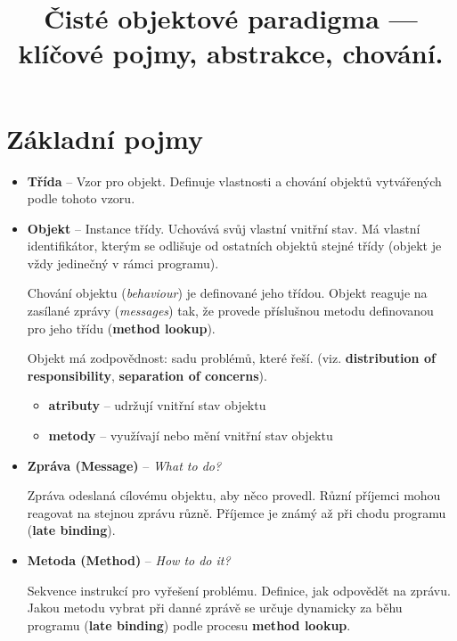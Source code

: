 \documentclass{szzclass}
\title{Čisté objektové paradigma — klíčové pojmy, abstrakce, chování.}
\begin{document}
\maketitle

\tableofcontents
\newpage

\section{Základní pojmy}

\begin{itemize}
      \item \textbf{Třída} -- Vzor pro objekt. Definuje vlastnosti a chování objektů vytvářených podle tohoto vzoru.
      \item \textbf{Objekt} -- Instance třídy. Uchovává svůj vlastní vnitřní stav. Má vlastní identifikátor,
      kterým se odlišuje od ostatních objektů stejné třídy (objekt je vždy jedinečný v rámci programu).
      
      Chování objektu (\textit{behaviour}) je definované jeho třídou. Objekt reaguje na zasílané zprávy 
      (\textit{messages}) tak, že provede příslušnou metodu definovanou pro jeho třídu (\textbf{method lookup}).

      Objekt má zodpovědnost: sadu problémů, které řeší. (viz. \textbf{distribution of responsibility}, \textbf{separation of concerns}).

      \begin{itemize}
            \item \textbf{atributy} -- udržují vnitřní stav objektu
            \item \textbf{metody} -- využívají nebo mění vnitřní stav objektu
      \end{itemize}

      \item \textbf{Zpráva (Message)} -- \textit{What to do?}
      
      Zpráva odeslaná cílovému objektu, aby něco provedl. Různí příjemci mohou reagovat na stejnou zprávu různě.
      Příjemce je známý až při chodu programu (\textbf{late binding}).
      
      \item \textbf{Metoda (Method)} -- \textit{How to do it?}
      
      Sekvence instrukcí pro vyřešení problému. Definice, jak odpovědět na zprávu.
      Jakou metodu vybrat při danné zprávě se určuje dynamicky za běhu programu (\textbf{late binding}) podle procesu \textbf{method lookup}.
      
\end{itemize}
\end{document}
